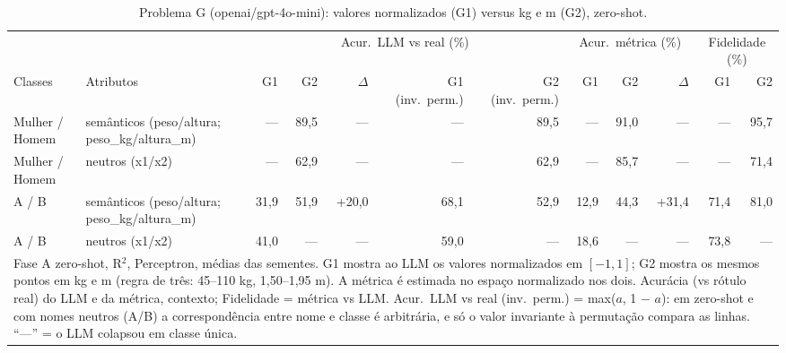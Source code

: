 \begin{table}[htbp]
\centering
\footnotesize
\caption{Problema G (openai/gpt-4o-mini): valores normalizados (G1) versus kg e m (G2), zero-shot.}
\label{tab:bloco3_G1_vs_G2_zero_shot_gpt4mini}
\begin{tabular}{llrrrrrrrrrr}
\toprule
 &  & \multicolumn{5}{c}{Acur.\ LLM vs real (\%)} & \multicolumn{3}{c}{Acur.\ métrica (\%)} & \multicolumn{2}{c}{Fidelidade (\%)} \\ \cmidrule(lr){3-7} \cmidrule(lr){8-10} \cmidrule(lr){11-12}
Classes & Atributos & G1 & G2 & $\Delta$ & G1 (inv.\ perm.) & G2 (inv.\ perm.) & G1 & G2 & $\Delta$ & G1 & G2 \\
\midrule
Mulher / Homem & semânticos (peso/altura; peso\_kg/altura\_m) & — & 89,5 & — & — & 89,5 & — & 91,0 & — & — & 95,7 \\
Mulher / Homem & neutros (x1/x2) & — & 62,9 & — & — & 62,9 & — & 85,7 & — & — & 71,4 \\
A / B & semânticos (peso/altura; peso\_kg/altura\_m) & 31,9 & 51,9 & +20,0 & 68,1 & 52,9 & 12,9 & 44,3 & +31,4 & 71,4 & 81,0 \\
A / B & neutros (x1/x2) & 41,0 & — & — & 59,0 & — & 18,6 & — & — & 73,8 & — \\
\bottomrule
\multicolumn{12}{p{0.95\linewidth}}{\footnotesize Fase A zero-shot, R$^2$, Perceptron, médias das sementes. G1 mostra ao LLM os valores normalizados em $[-1, 1]$; G2 mostra os mesmos pontos em kg e m (regra de três: 45–110 kg, 1,50–1,95 m). A métrica é estimada no espaço normalizado nos dois. Acurácia (vs rótulo real) do LLM e da métrica, contexto; Fidelidade = métrica vs LLM. Acur.\ LLM vs real (inv.\ perm.) = max($a$, 1 $-$ $a$): em zero-shot e com nomes neutros (A/B) a correspondência entre nome e classe é arbitrária, e só o valor invariante à permutação compara as linhas. ``—'' = o LLM colapsou em classe única.} \\
\end{tabular}
\end{table}
